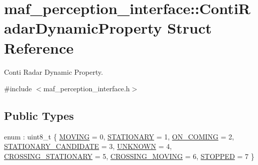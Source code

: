 \hypertarget{structmaf__perception__interface_1_1ContiRadarDynamicProperty}{}\section{maf\+\_\+perception\+\_\+interface\+:\+:Conti\+Radar\+Dynamic\+Property Struct Reference}
\label{structmaf__perception__interface_1_1ContiRadarDynamicProperty}


Conti Radar Dynamic Property.  




{\ttfamily \#include $<$maf\+\_\+perception\+\_\+interface.\+h$>$}

\subsection*{Public Types}
\begin{DoxyCompactItemize}
\item 
enum \+: uint8\+\_\+t \{ \newline
\hyperlink{structmaf__perception__interface_1_1ContiRadarDynamicProperty_ae9e35455924ab1b3f7c4638997ebb794a16dcd00f150934f59a2834c2f8c2b058}{M\+O\+V\+I\+NG} = 0, 
\hyperlink{structmaf__perception__interface_1_1ContiRadarDynamicProperty_ae9e35455924ab1b3f7c4638997ebb794a3f3794dfecfb7fcf2d7d5ab1243b0e0e}{S\+T\+A\+T\+I\+O\+N\+A\+RY} = 1, 
\hyperlink{structmaf__perception__interface_1_1ContiRadarDynamicProperty_ae9e35455924ab1b3f7c4638997ebb794a1ba7fedf7ab878b5d1aa68123eca5f79}{O\+N\+\_\+\+C\+O\+M\+I\+NG} = 2, 
\hyperlink{structmaf__perception__interface_1_1ContiRadarDynamicProperty_ae9e35455924ab1b3f7c4638997ebb794a98dddd04d6b9771371f532904d0dbe28}{S\+T\+A\+T\+I\+O\+N\+A\+R\+Y\+\_\+\+C\+A\+N\+D\+I\+D\+A\+TE} = 3, 
\newline
\hyperlink{structmaf__perception__interface_1_1ContiRadarDynamicProperty_ae9e35455924ab1b3f7c4638997ebb794a33a580ccf98c2e49c041532db263c6c1}{U\+N\+K\+N\+O\+WN} = 4, 
\hyperlink{structmaf__perception__interface_1_1ContiRadarDynamicProperty_ae9e35455924ab1b3f7c4638997ebb794aa8eaebc4c2318cb8031e5d23de9a0bc1}{C\+R\+O\+S\+S\+I\+N\+G\+\_\+\+S\+T\+A\+T\+I\+O\+N\+A\+RY} = 5, 
\hyperlink{structmaf__perception__interface_1_1ContiRadarDynamicProperty_ae9e35455924ab1b3f7c4638997ebb794a07d348b2122d09131e4ef5e8828f7777}{C\+R\+O\+S\+S\+I\+N\+G\+\_\+\+M\+O\+V\+I\+NG} = 6, 
\hyperlink{structmaf__perception__interface_1_1ContiRadarDynamicProperty_ae9e35455924ab1b3f7c4638997ebb794a29cc08ea35196f3558874ac6b52a6ca1}{S\+T\+O\+P\+P\+ED} = 7
 \}
\end{DoxyCompactItemize}
